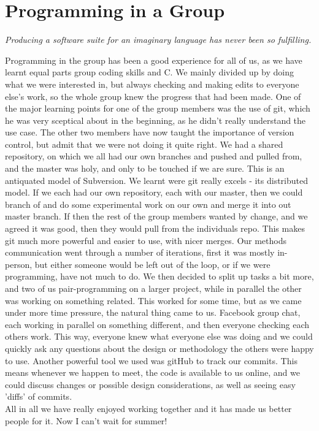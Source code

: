 \documentclass[11pt]{report}
\begin{document}
\section*{Programming in a Group}

\begin{center}\textit{Producing a software suite for an imaginary language has never been so fulfilling.} \end{center}
Programming in the group has been a good experience for all of us, as we have 
learnt equal parts group coding skills and C. We mainly divided up by doing 
what we were interested in, but always checking and making edits to everyone 
else's work, so the whole group knew the progress that had been made. One of 
the major learning points for one of the group members was the use of git, which 
he was very sceptical about in the beginning, as he didn't really understand the 
use case. The other two members have now taught the importance of version 
control, but admit that we were not doing it quite right. We had a shared 
repository, on which we all had our own branches and pushed and pulled from, 
and the master was holy, and only to be touched if we are sure. This is an 
antiquated model of Subversion. We learnt were git really excels -  its 
distributed model. If we each had our own repository, each with our master, 
then we could branch of and do some experimental work on our own and merge it 
into out master branch. If then the rest of the group members wanted by change, 
and we agreed it was good, then they would pull from the individuals repo. This 
makes git much more powerful and easier to use, with nicer merges. Our methods 
communication went through a number of iterations, first it was mostly 
in-person, but either someone would be left out of the loop, or if we were 
programming, have not much to do. We then decided to split up tasks a bit more, 
and two of us pair-programming on a larger project, while in parallel the other 
was working on something related. This worked for some time, but as we came 
under more time pressure, the natural thing came to us. Facebook group chat, 
each working in parallel on something different, and then everyone checking each 
others work. This way, everyone knew what everyone else was doing and we could 
quickly ask any questions about the design or methodology the others were happy 
to use. Another powerful tool we used was gitHub to track our commits. This 
means whenever we happen to meet, the code is available to us online, and we 
could discuss changes or possible design considerations, as well as seeing easy 
'diffs' of commits.\\
All in all we have really enjoyed working together and it has made us better people for it. Now I can't wait for summer!
\end{document}
